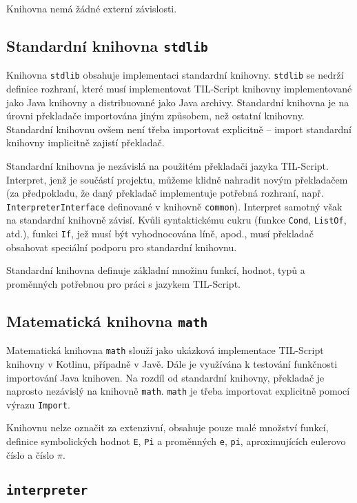 Knihovna nemá žádné externí závislosti.

\subsection{Standardní knihovna \lstinline{stdlib}}

Knihovna \lstinline{stdlib} obsahuje implementaci standardní knihovny. \lstinline{stdlib}
se nedrží definice rozhraní, které musí implementovat TIL-Script knihovny implementované jako Java
knihovny a distribuované jako Java archivy. Standardní knihovna je na úrovni překladače importována
jiným způsobem, než ostatní knihovny. Standardní knihovnu ovšem není třeba importovat explicitně --
import standardní knihovny implicitně zajistí překladač.

Standardní knihovna je nezávislá na použitém překladači jazyka TIL-Script. Interpret, jenž je
součástí projektu, můžeme klidně nahradit novým překladačem (za předpokladu, že daný překladač
implementuje potřebná rozhraní, např. \lstinline{InterpreterInterface} definované v knihovně
\lstinline{common}). Interpret samotný však na standardní knihovně závisí. Kvůli syntaktickému
cukru (funkce \lstinline{Cond}, \lstinline{ListOf}, atd.), funkci \lstinline{If}, jež musí být
vyhodnocována líně, apod., musí překladač obsahovat speciální podporu pro standardní knihovnu.

Standardní knihovna definuje základní množinu funkcí, hodnot, typů a proměnných potřebnou pro práci
s jazykem TIL-Script.

\subsection{Matematická knihovna \lstinline{math}}

Matematická knihovna \lstinline{math} slouží jako ukázková implementace TIL-Script knihovny
v Kotlinu, případně v Javě. Dále je využívána k testování funkčnosti importování Java knihoven.
Na rozdíl od standardní knihovny, překladač je naprosto nezávislý na knihovně \lstinline{math}.
\lstinline{math} je třeba importovat explicitně pomocí výrazu \lstinline{Import}.

Knihovnu nelze označit za extenzivní, obsahuje pouze malé množství funkcí, definice symbolických
hodnot \lstinline{E}, \lstinline{Pi} a proměnných \lstinline{e}, \lstinline{pi}, aproximujících
eulerovo číslo a číslo $\pi$.

\subsection{\lstinline{interpreter}}

